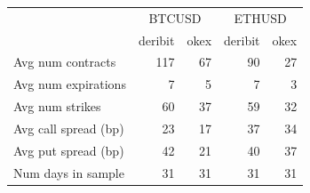 \begin{tabular}{lrrrr}
\toprule
 & \multicolumn{2}{c}{BTCUSD} & \multicolumn{2}{c}{ETHUSD} \\
 & deribit & okex & deribit & okex \\
\midrule
Avg num contracts & 117 & 67 & 90 & 27 \\
Avg num expirations & 7 & 5 & 7 & 3 \\
Avg num strikes & 60 & 37 & 59 & 32 \\
Avg call spread (bp) & 23 & 17 & 37 & 34 \\
Avg put spread (bp) & 42 & 21 & 40 & 37 \\
Num days in sample & 31 & 31 & 31 & 31 \\
\bottomrule
\end{tabular}
